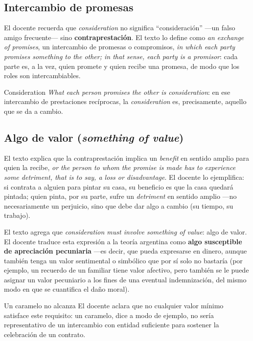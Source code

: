 \documentclass[12pt,oneside]{book}
\begin{document}
\subsection{Intercambio de promesas}

El docente recuerda que \textit{consideration} no significa ``consideración'' —un falso amigo frecuente— sino \textbf{contraprestación}. El texto lo define como \textit{an exchange of promises}, un intercambio de promesas o compromisos, \textit{in which each party promises something to the other; in that sense, each party is a promisor}: cada parte es, a la vez, quien promete y quien recibe una promesa, de modo que los roles son intercambiables.

\begin{definition}{Consideration}
\textit{What each person promises the other is consideration}: en ese intercambio de prestaciones recíprocas, la \textit{consideration} es, precisamente, aquello que se da a cambio.
\end{definition}

\subsection{Algo de valor (\textit{something of value})}

El texto explica que la contraprestación implica un \textit{benefit} en sentido amplio para quien la recibe, \textit{or the person to whom the promise is made has to experience some detriment, that is to say, a loss or disadvantage}. El docente lo ejemplifica: si contrata a alguien para pintar su casa, su beneficio es que la casa quedará pintada; quien pinta, por su parte, sufre un \textit{detriment} en sentido amplio —no necesariamente un perjuicio, sino que debe dar algo a cambio (su tiempo, su trabajo).

El texto agrega que \textit{consideration must involve something of value}: algo de valor. El docente traduce esta expresión a la teoría argentina como \textbf{algo susceptible de apreciación pecuniaria} —es decir, que pueda expresarse en dinero, aunque también tenga un valor sentimental o simbólico que por sí solo no bastaría (por ejemplo, un recuerdo de un familiar tiene valor afectivo, pero también se le puede asignar un valor pecuniario a los fines de una eventual indemnización, del mismo modo en que se cuantifica el daño moral).

\begin{example}{Un caramelo no alcanza}
El docente aclara que no cualquier valor mínimo satisface este requisito: un caramelo, dice a modo de ejemplo, no sería representativo de un intercambio con entidad suficiente para sostener la celebración de un contrato.
\end{example}
\end{document}
